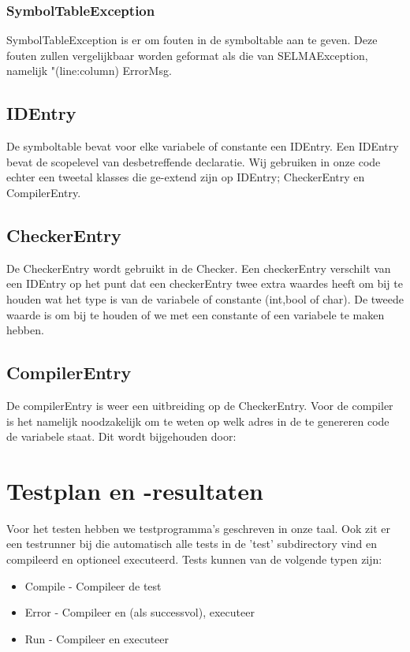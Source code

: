 \documentclass[]{article}
\begin{document}
\subsubsection{SymbolTableException}
SymbolTableException is er om fouten in de symboltable aan te geven. Deze fouten zullen vergelijkbaar worden geformat als die van SELMAException, namelijk "(line:column) ErrorMsg.

\subsection{IDEntry}
De symboltable bevat voor elke variabele of constante een IDEntry. Een IDEntry bevat de scopelevel van desbetreffende declaratie. Wij gebruiken in onze code echter een tweetal klasses die ge-extend zijn op IDEntry; CheckerEntry en CompilerEntry.

\subsection{CheckerEntry}
De CheckerEntry wordt gebruikt in de Checker. Een checkerEntry verschilt van een IDEntry op het punt dat een checkerEntry twee extra waardes heeft om bij te houden wat het type is van de variabele of constante (int,bool of char). De tweede waarde is om bij te houden of we met een constante of een variabele te maken hebben.


\subsection{CompilerEntry}
De compilerEntry is weer een uitbreiding op de CheckerEntry. Voor de compiler is het namelijk noodzakelijk om te weten op welk adres in de te genereren code de variabele staat. Dit wordt bijgehouden door:


\newpage
\section{Testplan en -resultaten}
Voor het testen hebben we testprogramma's geschreven in onze taal. Ook zit er een testrunner bij die automatisch alle tests in de 'test' subdirectory vind en compileerd en optioneel executeerd.
Tests kunnen van de volgende typen zijn:
\begin{itemize}
	\item Compile - Compileer de test
	\item Error	    - Compileer en (als successvol), executeer
	\item Run		    - Compileer en executeer
\end{itemize}
\end{document}
